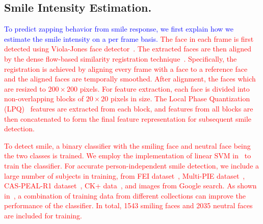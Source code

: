 \documentclass[twoside,leqno,twocolumn]{article}
\newcommand{\Songfan}[1]{\textcolor{red}{#1}}
\newcommand{\SFAdd}[1]{\textcolor{blue}{#1}}
\begin{document}
\subsection{Smile Intensity Estimation.}

\SFAdd{To predict zapping behavior from smile response, we first explain how we estimate the smile intensity on a per frame basis.} \Songfan{The face in each frame is first detected using Viola-Jones face detector~\cite{Viola_IJCV04}. The extracted faces are then aligned by the dense flow-based similarity registration technique~\cite{Yang13}. Specifically, the registration is achieved by aligning every frame with a face to a reference face and the aligned faces are temporally smoothed. After alignment, the faces which are resized to $200\times200$ pixels. For feature extraction, each face is divided into non-overlapping blocks of $20\times20$ pixels in size. The Local Phase Quantization (LPQ)~\cite{Ojansivu_ICISP08} features are extracted from each block, and features from all blocks are then concatenated to form the final feature representation for subsequent smile detection.}

\Songfan{To detect smile, a binary classifier with the smiling face and neutral face being the two classes is trained. We employ the implementation of linear SVM in~\cite{SVMlib} to train the classifier. For accurate person-independent smile detection, we include a large number of subjects in training, from FEI dataset~\cite{FEI}, Multi-PIE dataset~\cite{MPIE}, CAS-PEAL-R1 dataset~\cite{CAS}, CK+ data~\cite{CKplus}, and images from Google search. As shown in~\cite{Le14}, a combination of training data from different collections can improve the performance of the classifier. In total, 1543 smiling faces and 2035 neutral faces are included for training.}
\end{document}
